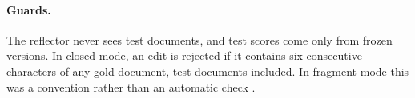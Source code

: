 \paragraph{Guards.} The reflector never sees test documents, and test scores come only from frozen versions. In closed mode, an edit is rejected if it contains six consecutive characters of any gold document, test documents included. In fragment mode this was a convention rather than an automatic check .
